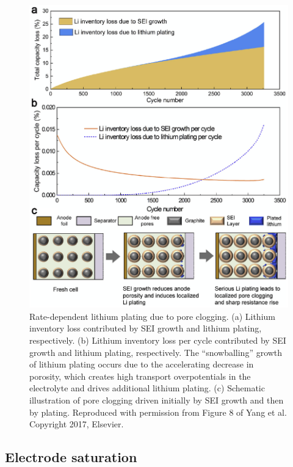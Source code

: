 \documentclass[journal=jpclcd,manuscript=article]{achemso}
\begin{document}
\begin{figure}
    \centering
    \includegraphics[scale=0.7]{figures/li_plating_porosity_yang.eps}
    \caption{Rate-dependent lithium plating due to pore clogging. (a) Lithium inventory loss contributed by SEI growth and lithium plating, respectively. (b) Lithium inventory loss per cycle contributed by SEI growth and lithium plating, respectively. The ``snowballing'' growth of lithium plating occurs due to the accelerating decrease in porosity, which creates high transport overpotentials in the electrolyte and drives additional lithium plating. (c) Schematic illustration of pore clogging driven initially by SEI growth and then by plating. Reproduced with permission from Figure 8 of Yang et al.\cite{yang_modeling_2017} Copyright 2017, Elsevier.}
    \label{fig:pore_clogging}
\end{figure}

\subsection{Electrode saturation}
\end{document}
